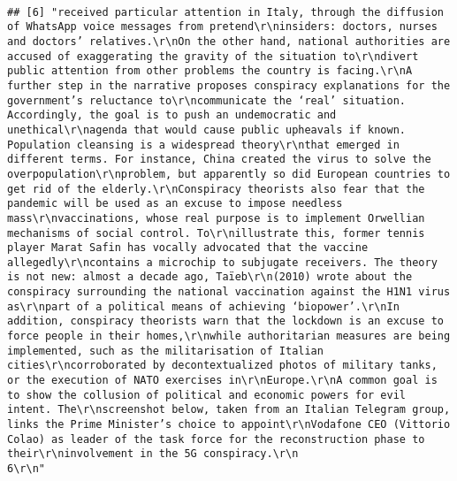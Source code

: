 \documentclass[
]{book}
\begin{document}
\begin{verbatim}
                                                                                                                                                                                                                                                                                                                                                                                                                                                                                                                                                                                                                                                                                                                                                                                                                                                                                         
## [6] "received particular attention in Italy, through the diffusion of WhatsApp voice messages from pretend\r\ninsiders: doctors, nurses and doctors’ relatives.\r\nOn the other hand, national authorities are accused of exaggerating the gravity of the situation to\r\ndivert public attention from other problems the country is facing.\r\nA further step in the narrative proposes conspiracy explanations for the government’s reluctance to\r\ncommunicate the ‘real’ situation. Accordingly, the goal is to push an undemocratic and unethical\r\nagenda that would cause public upheavals if known. Population cleansing is a widespread theory\r\nthat emerged in different terms. For instance, China created the virus to solve the overpopulation\r\nproblem, but apparently so did European countries to get rid of the elderly.\r\nConspiracy theorists also fear that the pandemic will be used as an excuse to impose needless mass\r\nvaccinations, whose real purpose is to implement Orwellian mechanisms of social control. To\r\nillustrate this, former tennis player Marat Safin has vocally advocated that the vaccine allegedly\r\ncontains a microchip to subjugate receivers. The theory is not new: almost a decade ago, Taïeb\r\n(2010) wrote about the conspiracy surrounding the national vaccination against the H1N1 virus as\r\npart of a political means of achieving ‘biopower’.\r\nIn addition, conspiracy theorists warn that the lockdown is an excuse to force people in their homes,\r\nwhile authoritarian measures are being implemented, such as the militarisation of Italian cities\r\ncorroborated by decontextualized photos of military tanks, or the execution of NATO exercises in\r\nEurope.\r\nA common goal is to show the collusion of political and economic powers for evil intent. The\r\nscreenshot below, taken from an Italian Telegram group, links the Prime Minister’s choice to appoint\r\nVodafone CEO (Vittorio Colao) as leader of the task force for the reconstruction phase to their\r\ninvolvement in the 5G conspiracy.\r\n                                                                                                    6\r\n"                                                                                                                                                                                                                                                                                                                                          
\end{verbatim}
\end{document}
